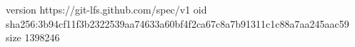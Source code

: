 version https://git-lfs.github.com/spec/v1
oid sha256:3b94cf11f3b2322539aa74633a60bf4f2ca67c8a7b91311c1c88a7aa245aac59
size 1398246
